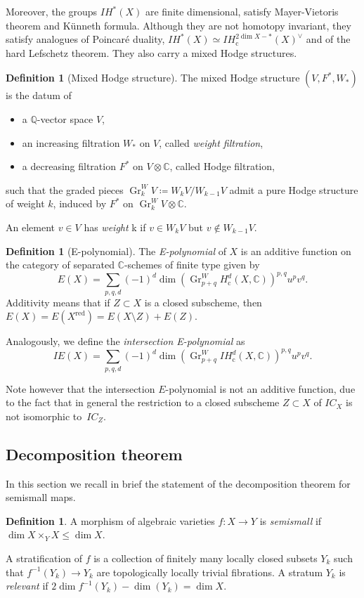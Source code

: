 \documentclass[JEP,XML,SOM,Unicode, NoEqCountersInSection,NoFloatCountersInSection,published]{cedram}
\newcommand{\cc}{\mathrm{c}}
\newcommand{\IC}{\mathit{IC}}
\newcommand{\IE}{\mathit{IE}}
\newcommand{\IH}{\mathit{IH}}
\theoremstyle{definition}
\newtheorem{defn}[thm]{Definition}
\newcommand{\CC}{\mathbb{C}}
\newcommand{\QQ}{\mathbb{Q}}
\newcommand{\Gr}{\operatorname{Gr}}
\begin{document}
Moreover, the groups $\IH^*(X)$ are finite dimensional, satisfy Mayer-Vietoris theorem and Künneth formula. Although they are not homotopy invariant, they satisfy analogues of Poincaré duality, \ie $\IH^*(X) \simeq \IH^{2\dim X -*}_{\cc}(X)^{\vee}$ and of the hard Lefschetz theorem.
They also carry a mixed Hodge structures.

\begin{defn}[Mixed Hodge structure] The mixed Hodge structure $(V, F^{*}, W_*)$ is the datum of
\begin{itemize}
\item a $\QQ$-vector space $V$,
		\item an increasing filtration $W_{*}$ on $V$, called \emph{weight filtration},
		\item a decreasing filtration $F^{*}$ on $V \otimes \CC$, called Hodge filtration,
	\end{itemize}
such that the graded pieces $\Gr_k^W V \coloneqq W_kV/W_{k-1}V$ admit a pure Hodge structure of weight $k$, induced by $F^{*}$ on $\Gr_k^W V \otimes \CC$.

An element $v \in V$ has \emph{weight} k if $v \in W_kV$ but $v \not\in W_{k-1}V$.
\end{defn}

\begin{defn}[E-polynomial] The \emph{E-polynomial} of $X$ is an additive function on the category of separated $\CC$-schemes of finite type given by
\[
E(X) = \sum_{p,q,d}(-1)^d \dim ( \Gr^W_{p+q} H^d_{\cc}(X, \CC))^{p,q} u^pv^q.
\]
Additivity means that if $Z \subset X$ is a closed subscheme, then $E(X)=E(X^{\mathrm{red}})=E(X \setminus Z)+ E(Z)$.

Analogously, we define the \emph{intersection E-polynomial} as
\[
\IE(X) = \sum_{p,q,d}(-1)^d \dim ( \Gr^W_{p+q} \IH^d_{\cc}(X, \CC))^{p,q} u^pv^q.
\]
\end{defn}

Note however that the intersection $E$-polynomial is not an additive function, due to the fact that in general the restriction to a closed subscheme $Z\subset X$ of $\IC_X$ is not isomorphic to~$\IC_Z$.

\subsection{Decomposition theorem}
In this section we recall in brief the statement of the decomposition theorem for semismall maps.
\begin{defn}
A morphism of algebraic varieties $f\colon X \to Y$ is \emph{semismall} if $\dim X \times_Y X \leq \dim X$.
\end{defn}
A stratification of $f$ is a collection of finitely many locally closed subsets $Y_k$ such that $f^{-1}(Y_k) \to Y_k$ are topologically locally trivial fibrations. A stratum $Y_k$ is \emph{relevant} if $2 \dim f^{-1}(Y_k) - \dim(Y_k)=\dim X$.
\end{document}
